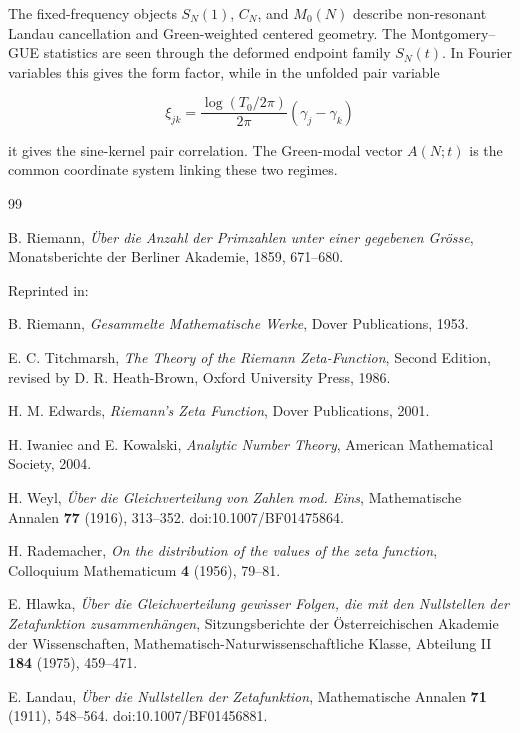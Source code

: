 \documentclass[11pt]{amsart}
\numberwithin{equation}{section}
\theoremstyle{plain}
\theoremstyle{definition}
\theoremstyle{remark}
\begin{document}
The fixed-frequency objects \(S_N(1)\), \(C_N\), and \(M_0(N)\)
describe non-resonant Landau cancellation and Green-weighted centered
geometry. The Montgomery--GUE statistics are seen through the deformed
endpoint family \(S_N(t)\). In Fourier variables this gives the form
factor, while in the unfolded pair variable

\begin{equation}
\xi_{jk}
=
\frac{\log(T_0/2\pi)}{2\pi}
(\gamma_j-\gamma_k)
\label{eq:conclusion_unfolded_pair_variable_xi}
\end{equation}

it gives the sine-kernel pair correlation. The Green-modal vector
\(A(N;t)\) is the common coordinate system linking these two regimes.

\begin{thebibliography}{99}
\sloppy
{}

B. Riemann,
\emph{\"Uber die Anzahl der Primzahlen unter einer gegebenen Gr\"osse},
Monatsberichte der Berliner Akademie,
1859,
671--680.

Reprinted in:

B. Riemann,
\emph{Gesammelte Mathematische Werke},
Dover Publications,
1953.

E. C. Titchmarsh,
\emph{The Theory of the Riemann Zeta-Function},
Second Edition,
revised by D. R. Heath-Brown,
Oxford University Press,
1986.

H. M. Edwards,
\emph{Riemann's Zeta Function},
Dover Publications,
2001.

H. Iwaniec and E. Kowalski,
\emph{Analytic Number Theory},
American Mathematical Society,
2004.

H. Weyl,
\emph{\"Uber die Gleichverteilung von Zahlen mod. Eins},
Mathematische Annalen
\textbf{77} (1916),
313--352.
doi:10.1007/BF01475864.

H. Rademacher,
\emph{On the distribution of the values of the zeta function},
Colloquium Mathematicum
\textbf{4} (1956),
79--81.

E. Hlawka,
\emph{\"Uber die Gleichverteilung gewisser Folgen,
die mit den Nullstellen der Zetafunktion zusammenh\"angen},
Sitzungsberichte der
\"Osterreichischen Akademie der Wissenschaften,
Mathematisch-Naturwissenschaftliche Klasse,
Abteilung II
\textbf{184} (1975),
459--471.

E. Landau,
\emph{\"Uber die Nullstellen der Zetafunktion},
Mathematische Annalen
\textbf{71} (1911),
548--564.
doi:10.1007/BF01456881.


\end{thebibliography}
\end{document}
